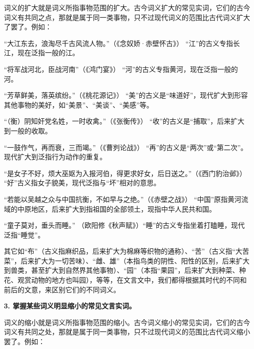 词义的扩大就是词义所指事物范围的扩大。古今词义扩大的常见实词，它们的古今词义有共同之点，那就是属于同一类事物，只不过现代词义的范围比古代词义扩大了罢了。例如：
\begin{entry}
\item[江：]“大江东去，浪淘尽千古风流人物。”（《念奴娇·赤壁怀古》） “江”的古义专指长江，现在泛指一般的江。

\item[河：]“将军战河北，臣战河南”（《鸿门宴》） “河”的古义专指黄河，现在泛指一般的河。

\item[美：]“芳草鲜美，落英缤纷。”（《桃花源记》） “美”的古义是“味道好”，现代扩大到形容其他事物的美好，如“美景”、“美谈”、“美感”等。

\item[收：]“（衡）阴知奸党名姓，一时收禽。”（《张衡传》） “收”的古义是“捕取”，后来扩大到一般的收取。

\item[再：]“一鼓作气，再而衰，三而竭。”（《曹刿论战》） “再”的古义是“两次”或“第二次”。现代扩大到泛指行为动作的重复。

\item[好：]“是女子不好，烦大巫妪为入报河伯，得更求好女，后日送之。”（《西门豹治邺》） “好”古义指女子貌美，现代泛指与“坏”相对的意思。

\item[中国：]“若能以吴越之众与中国抗衡，不如早与之绝。”（《赤壁之战》） “中国”原指黄河流域的中原地区，后来扩大到指祖国的全部领土，现指中华人民共和国。

\item[睡：]“童子莫对，垂头而睡。” （欧阳修《秋声赋》）“睡”的古义专指坐着打瞌睡，现代泛指“睡觉”。
\end{entry}

其它如“布”（古义指麻织品，后来扩大为棉麻等织物的通称）、“苦”（古义指“大苦菜”，后来扩大为一切苦味）、“雌、雄”（本指鸟类的阴性、阳性的区别，后来扩大到兽类，甚至扩大到自然界其他事物）、“园”（本指“果园”，后来扩大到种菜、种花、观赏动物的地方也叫园），等等，在文言文中，我们都得根据其时代的不同和前后的文意，来区别它们的不同词义。

\textbf{3. 掌握某些词义明显缩小的常见文言实词。}

词义的缩小就是词义所指事物范围的缩小。古今词义缩小的常见实词，它们的古今词义有共同之处，那就是属于同一类事物，只不过现代词义的范围比古代词义缩小罢了。例如：


